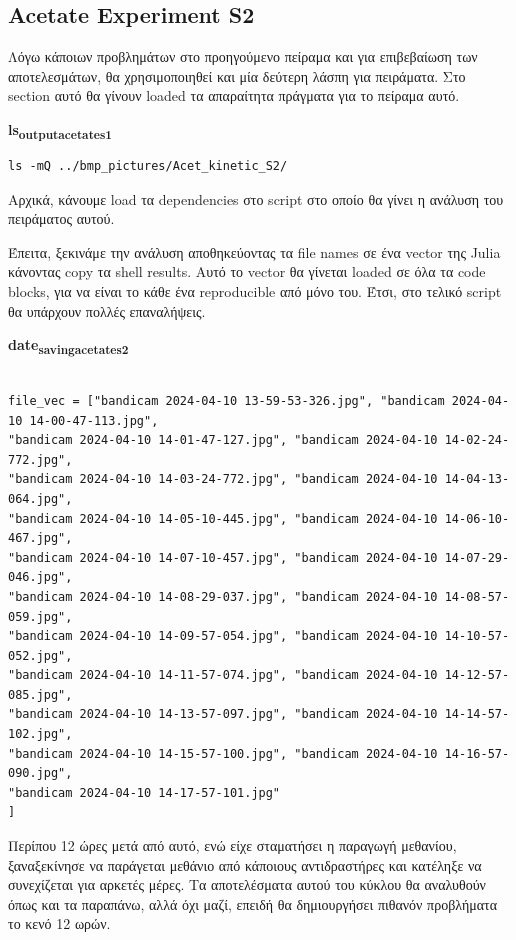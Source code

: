 \documentclass[11pt]{article}
\begin{document}
\subsection{Acetate Experiment S2}
\label{sec:org59cc608}
Λόγω κάποιων προβλημάτων στο προηγούμενο πείραμα και για επιβεβαίωση των αποτελεσμάτων, θα χρησιμοποιηθεί και μία δεύτερη λάσπη για πειράματα. Στο section αυτό θα γίνουν loaded τα απαραίτητα πράγματα για το πείραμα αυτό.

\textbf{ls\textsubscript{output}\textsubscript{acetate}\textsubscript{s1}}
\begin{verbatim}
ls -mQ ../bmp_pictures/Acet_kinetic_S2/
\end{verbatim}

Αρχικά, κάνουμε load τα dependencies στο script στο οποίο θα γίνει η ανάλυση του πειράματος αυτού.

Έπειτα, ξεκινάμε την ανάλυση αποθηκεύοντας τα file names σε ένα vector της Julia κάνοντας copy τα shell results. Αυτό το vector θα γίνεται loaded σε όλα τα code blocks, για να είναι το κάθε ένα reproducible από μόνο του. Έτσι, στο τελικό script θα υπάρχουν πολλές επαναλήψεις.

\textbf{date\textsubscript{saving}\textsubscript{acetate}\textsubscript{s2}}
\begin{verbatim}

file_vec = ["bandicam 2024-04-10 13-59-53-326.jpg", "bandicam 2024-04-10 14-00-47-113.jpg",
"bandicam 2024-04-10 14-01-47-127.jpg", "bandicam 2024-04-10 14-02-24-772.jpg",
"bandicam 2024-04-10 14-03-24-772.jpg", "bandicam 2024-04-10 14-04-13-064.jpg",
"bandicam 2024-04-10 14-05-10-445.jpg", "bandicam 2024-04-10 14-06-10-467.jpg",
"bandicam 2024-04-10 14-07-10-457.jpg", "bandicam 2024-04-10 14-07-29-046.jpg",
"bandicam 2024-04-10 14-08-29-037.jpg", "bandicam 2024-04-10 14-08-57-059.jpg",
"bandicam 2024-04-10 14-09-57-054.jpg", "bandicam 2024-04-10 14-10-57-052.jpg",
"bandicam 2024-04-10 14-11-57-074.jpg", "bandicam 2024-04-10 14-12-57-085.jpg",
"bandicam 2024-04-10 14-13-57-097.jpg", "bandicam 2024-04-10 14-14-57-102.jpg",
"bandicam 2024-04-10 14-15-57-100.jpg", "bandicam 2024-04-10 14-16-57-090.jpg",
"bandicam 2024-04-10 14-17-57-101.jpg"
]

\end{verbatim}

Περίπου 12 ώρες μετά από αυτό, ενώ είχε σταματήσει η παραγωγή μεθανίου, ξαναξεκίνησε να παράγεται μεθάνιο από κάποιους αντιδραστήρες και κατέληξε να συνεχίζεται για αρκετές μέρες. Τα αποτελέσματα αυτού του κύκλου θα αναλυθούν όπως και τα παραπάνω, αλλά όχι μαζί, επειδή θα δημιουργήσει πιθανόν προβλήματα το κενό 12 ωρών.
\end{document}

